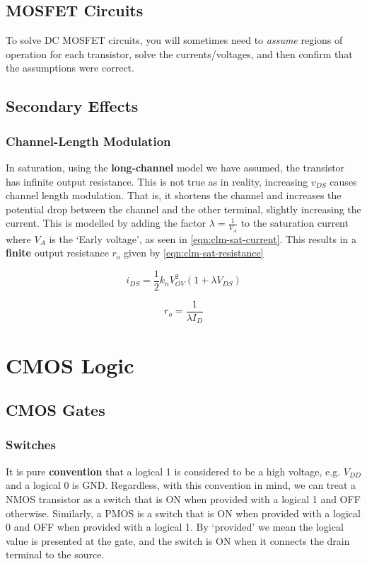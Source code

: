 \documentclass[11pt]{report}
\begin{document}
\section{MOSFET Circuits}
To solve DC MOSFET circuits, you will sometimes need to \textit{assume} regions of operation for each transistor, solve the currents/voltages, and then confirm that the assumptions were correct.

\section{Secondary Effects}

\subsection*{Channel-Length Modulation}
In saturation, using the \textbf{long-channel} model we have assumed, the transistor has infinite output resistance. This is not true as in reality, increasing $v_{DS}$ causes channel length modulation. That is, it shortens the channel and increases the potential drop between the channel and the other terminal, slightly increasing the current. This is modelled by adding the factor $\lambda = \frac{1}{V_A}$ to the saturation current where $V_A$ is the `Early voltage', as seen in \ref{eqn:clm-sat-current}. This results in a \textbf{finite} output resistance $r_o$ given by \ref{eqn:clm-sat-resistance}

\begin{equation}
	\label{eqn:clm-sat-current}
	i_{DS} = \frac{1}{2}k_nV_{OV}^2 (1 + \lambda V_{DS})
\end{equation}

\begin{equation}
	\label{eqn:clm-sat-resistance}
	r_o = \frac{1}{\lambda I_{D}}
\end{equation}


\chapter{CMOS Logic}

\section{CMOS Gates}

\subsection{Switches}
It is pure \textbf{convention} that a logical 1 is considered to be a high voltage, e.g. $V_{DD}$ and a logical 0 is GND. Regardless, with this convention in mind, we can treat a NMOS transistor as a switch that is ON when provided with a logical 1 and OFF otherwise. Similarly, a PMOS is a switch that is ON when provided with a logical 0 and OFF when provided with a logical 1. By `provided' we mean the logical value is presented at the gate, and the switch is ON when it connects the drain terminal to the source.
\end{document}
